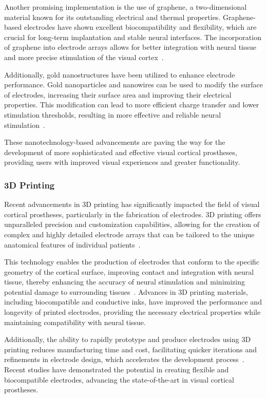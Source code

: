 \documentclass[twocolumn,10pt]{article}
\begin{document}
Another promising implementation is the use of graphene, a two-dimensional
material known for its outstanding electrical and thermal properties.
Graphene-based electrodes have shown excellent biocompatibility and flexibility,
which are crucial for long-term implantation and stable neural interfaces. The
incorporation of graphene into electrode arrays allows for better integration
with neural tissue and more precise stimulation of the visual
cortex~\parencite{luGraphenebasedNeurotechnologiesAdvanced2018}.

Additionally, gold nanostructures have been utilized to enhance electrode
performance. Gold nanoparticles and nanowires can be used to modify the surface
of electrodes, increasing their surface area and improving their electrical
properties. This modification can lead to more efficient charge transfer and
lower stimulation thresholds, resulting in more effective and reliable neural
stimulation~\parencite{zareGoldNanostructuresSynthesis2022}.

These nanotechnology-based advancements are paving the way for the development
of more sophisticated and effective visual cortical prostheses, providing users
with improved visual experiences and greater functionality.

\subsubsection*{3D Printing}
Recent advancements in 3D printing has significantly impacted the field of
visual cortical prostheses, particularly in the fabrication of electrodes. 3D
printing offers unparalleled precision and customization capabilities, allowing
for the creation of complex and highly detailed electrode arrays that can be
tailored to the unique anatomical features of individual
patients~\parencite{guoImplantableLiquidMetalbased2017}.

This technology enables the production of electrodes that conform to the
specific geometry of the cortical surface, improving contact and integration
with neural tissue, thereby enhancing the accuracy of neural stimulation and
minimizing potential damage to surrounding
tissues~\parencite{liuSoftElasticHydrogelbased2019}. Advances in 3D printing
materials, including biocompatible and conductive inks, have improved the
performance and longevity of printed electrodes, providing the necessary
electrical properties while maintaining compatibility with neural tissue.

Additionally, the ability to rapidly prototype and produce electrodes using 3D
printing reduces manufacturing time and cost, facilitating quicker iterations
and refinements in electrode design, which accelerates the development
process~\parencite{zhangClimbinginspiredTwiningElectrodes2019}. Recent studies
have demonstrated the potential in creating flexible and biocompatible
electrodes, advancing the state-of-the-art in visual cortical prostheses.
\end{document}
